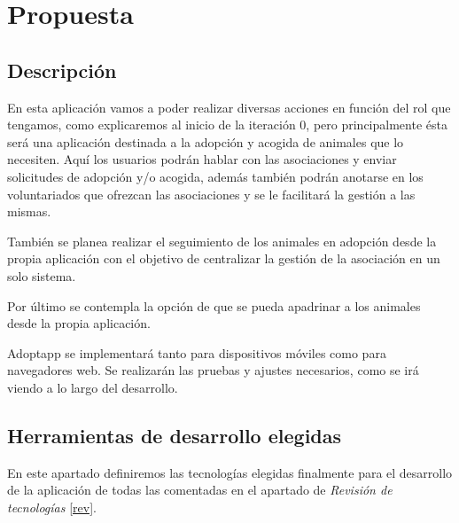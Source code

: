 \chapter{Propuesta} \label{propuesta}

\section{Descripción}
En esta aplicación vamos a poder realizar diversas acciones en función del rol que tengamos, como explicaremos al inicio de la iteración 0, pero principalmente ésta será una aplicación destinada a la adopción y acogida de animales que lo necesiten. Aquí los usuarios podrán hablar con las asociaciones y enviar solicitudes de adopción y/o acogida, además también podrán anotarse en los voluntariados que ofrezcan las asociaciones y se le facilitará la gestión a las mismas.

También se planea realizar el seguimiento de los animales en adopción desde la propia aplicación con el objetivo de centralizar la gestión de la asociación en un solo sistema.

Por último se contempla la opción de que se pueda apadrinar a los animales desde la propia aplicación.

Adoptapp se implementará tanto para dispositivos móviles como para navegadores web. Se realizarán las pruebas y ajustes necesarios, como se irá viendo a lo largo del desarrollo.

\section{Herramientas de desarrollo elegidas}
En este apartado definiremos las tecnologías elegidas finalmente para el desarrollo de la aplicación de todas las comentadas en el apartado de \textit{Revisión de tecnologías} \ref{rev}.

